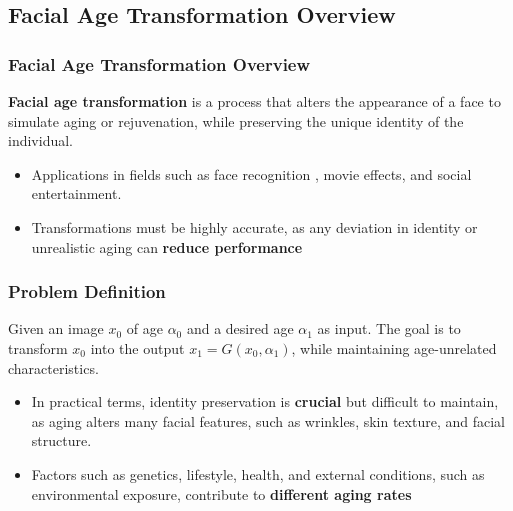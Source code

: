 \documentclass[aspectratio=169]{beamer}
\begin{document}

\subsection{Facial Age Transformation Overview}

\begin{frame}
\frametitle{Facial Age Transformation Overview}
\justifying

\textbf{Facial age transformation} is a process that alters the appearance of a face to simulate aging or rejuvenation, while preserving the unique identity of the individual.

\begin{itemize}
        \item Applications in fields such as face recognition \cite{crossrecognition}, movie effects, and social entertainment. \cite{agetransapplications}
        \item Transformations must be highly accurate, as any deviation in identity or unrealistic aging can \textbf{reduce performance}
\end{itemize}

\end{frame}


\begin{frame}
\frametitle{Problem Definition}
\justifying

Given an image $x_0$ of age $\alpha_0$ and a desired age $\alpha_1$ as input. The goal is to transform $x_0$ into the output $x_1 = G(x_0, \alpha_1)$, while maintaining age-unrelated characteristics.

\begin{itemize}
        \item In practical terms, identity preservation is \textbf{crucial} but difficult to maintain, as aging alters many facial features, such as wrinkles, skin texture, and facial structure.
        \item Factors such as genetics, lifestyle, health, and external conditions, such as environmental exposure, contribute to \textbf{different aging rates} \cite{agingrates}
\end{itemize}

\end{frame}
\end{document}
